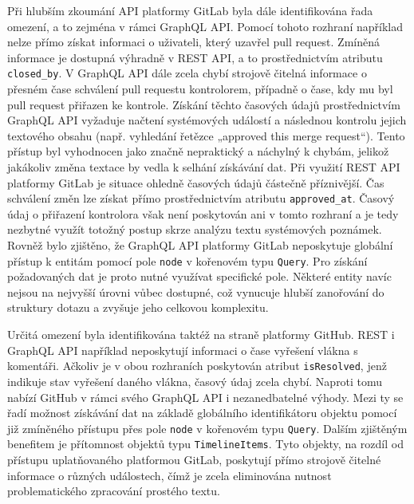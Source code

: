Při hlubším zkoumání API platformy GitLab byla dále identifikována řada omezení, a to zejména v rámci GraphQL API. Pomocí tohoto rozhraní například nelze přímo získat informaci o uživateli, který uzavřel pull request. Zmíněná informace je dostupná výhradně v REST API, a to prostřednictvím atributu \texttt{closed\_by}. V GraphQL API dále zcela chybí strojově čitelná informace o přesném čase schválení pull requestu kontrolorem, případně o čase, kdy mu byl pull request přiřazen ke kontrole. Získání těchto časových údajů prostřednictvím GraphQL API vyžaduje načtení systémových událostí a následnou kontrolu jejich textového obsahu (např. vyhledání řetězce „approved this merge request“). Tento přístup byl vyhodnocen jako značně nepraktický a náchylný k chybám, jelikož jakákoliv změna textace by vedla k selhání získávání dat. Při využití REST API platformy GitLab je situace ohledně časových údajů částečně příznivější. Čas schválení změn lze získat přímo prostřednictvím atributu \texttt{approved\_at}. Časový údaj o přiřazení kontrolora však není poskytován ani v tomto rozhraní a je tedy nezbytné využít totožný postup skrze analýzu textu systémových poznámek. Rovněž bylo zjištěno, že GraphQL API platformy GitLab neposkytuje globální přístup k entitám pomocí pole \texttt{node} v kořenovém typu \texttt{Query}. Pro získání požadovaných dat je proto nutné využívat specifické pole. Některé entity navíc nejsou na nejvyšší úrovni vůbec dostupné, což vynucuje hlubší zanořování do struktury dotazu a zvyšuje jeho celkovou komplexitu. \cite{GitLab-REST, GitLab-GraphQL}

Určitá omezení byla identifikována taktéž na straně platformy GitHub. REST i GraphQL API například neposkytují informaci o čase vyřešení vlákna s komentáři. Ačkoliv je v obou rozhraních poskytován atribut \texttt{isResolved}, jenž indikuje stav vyřešení daného vlákna, časový údaj zcela chybí. Naproti tomu nabízí GitHub v rámci svého GraphQL API i nezanedbatelné výhody. Mezi ty se řadí možnost získávání dat na základě globálního identifikátoru objektu pomocí již zmíněného přístupu přes pole \texttt{node} v kořenovém typu \texttt{Query}. Dalším zjištěným benefitem je přítomnost objektů typu \texttt{TimelineItems}. Tyto objekty, na rozdíl od přístupu uplatňovaného platformou GitLab, poskytují přímo strojově čitelné informace o různých událostech, čímž je zcela eliminována nutnost problematického zpracování prostého textu. \cite{GitHub-REST, GitHub-GraphQL}

